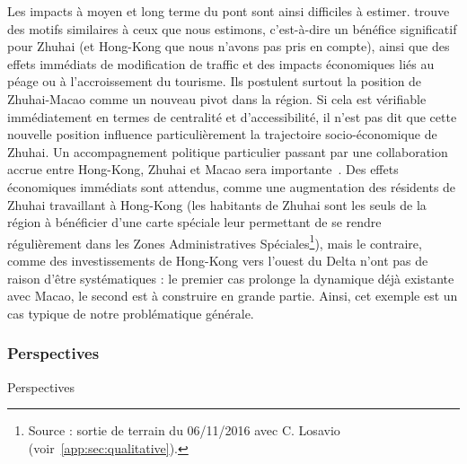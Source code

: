 Les impacts à moyen et long terme du pont sont ainsi difficiles à estimer. \cite{wu2012impact} trouve des motifs similaires à ceux que nous estimons, c'est-à-dire un bénéfice significatif pour Zhuhai (et Hong-Kong que nous n'avons pas pris en compte), ainsi que des effets immédiats de modification de traffic et des impacts économiques liés au péage ou à l'accroissement du tourisme. Ils postulent surtout la position de Zhuhai-Macao comme un nouveau pivot dans la région. Si cela est vérifiable immédiatement en termes de centralité et d'accessibilité, il n'est pas dit que cette nouvelle position influence particulièrement la trajectoire socio-économique de Zhuhai. Un accompagnement politique particulier passant par une collaboration accrue entre Hong-Kong, Zhuhai et Macao sera importante~\cite{zhou2016medium}. Des effets économiques immédiats sont attendus, comme une augmentation des résidents de Zhuhai travaillant à Hong-Kong (les habitants de Zhuhai sont les seuls de la région à bénéficier d'une carte spéciale leur permettant de se rendre régulièrement dans les Zones Administratives Spéciales\footnote{Source : sortie de terrain du 06/11/2016 avec C. Losavio (voir~\ref{app:sec:qualitative}).}), mais le contraire, comme des investissements de Hong-Kong vers l'ouest du Delta n'ont pas de raison d'être systématiques : le premier cas prolonge la dynamique déjà existante avec Macao, le second est à construire en grande partie. Ainsi, cet exemple est un cas typique de notre problématique générale.


\subsubsection{Perspectives}{Perspectives}




